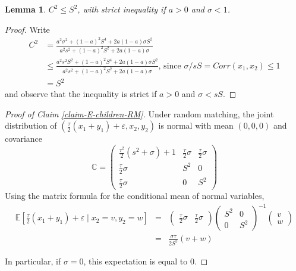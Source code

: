 \documentclass[
]{article}
\newtheorem{lemma}{Lemma}
\theoremstyle{definition}
\theoremstyle{definition}
\theoremstyle{definition}
\theoremstyle{definition}
\theoremstyle{remark}
\begin{document}
\begin{lemma}\label{C2}
 $C^2 \le S^2$, with strict inequality if $a > 0$ and $\sigma < 1$.

\end{lemma}
\begin{proof}
Write
\begin{align*}
C^{2}   &= \frac{
            a^{2}\sigma^{2}+(1-a)^{2}S^{4}+2a(1-a)\sigma S^{2}
         }{
           a^{2}s^{2}+(1-a)^{2}S^{2}+2a(1-a)\sigma
         } \\
    &\le \frac{
        a^{2}s^{2}S^{2}+(1-a)^{2}S^{4}+2a(1-a)\sigma S^{2}
      }{
        a^{2}s^{2}+(1-a)^{2}S^{2}+2a(1-a)\sigma
      }
      \textrm{, since }\sigma/sS = Corr(x_1,x_2) \le 1 \\
    &= S^{2}
\end{align*}
and observe that the inequality is strict if $a > 0$ and $\sigma < sS$.
\end{proof}

\begin{proof}[Proof of Claim \ref{claim-E-children-RM}]

Under random matching, the joint distribution of $\left( \frac{\tau }{2}\left(
x_{1}+y_{1}\right) +\varepsilon ,x_{2},y_{2}\right) $ is normal with mean 
$( 0,0,0)$ and covariance
\[
\mathbb{C}=\left( 
\begin{array}{lcr}
\frac{\tau ^{2}}{2}\left( s^{2}+\sigma \right) +1 & \frac{\tau }{2}\sigma  & 
\frac{\tau }{2}\sigma  \\ 
\frac{\tau }{2}\sigma  & S^{2} & 0 \\ 
\frac{\tau }{2}\sigma  & 0 & S^{2}%
\end{array}%
\right) 
\]%
Using the matrix formula for the conditional mean of normal variables,
\begin{eqnarray*}
\mathbb{E}\left[ \frac{\tau }{2}\left( x_{1}+y_{1}\right) +\varepsilon \mid
x_{2}=v,y_{2}=w\right]  &=&\left( 
\begin{array}{rr}
\frac{\tau }{2}\sigma  & \frac{\tau }{2}\sigma 
\end{array}%
\right) \left( 
\begin{array}{rr}
S^{2} & 0 \\ 
0 & S^{2}%
\end{array}%
\right) ^{-1}\left( 
\begin{array}{r}
v \\ 
w%
\end{array}%
\right)  \\
&=&\frac{\sigma \tau }{2S^{2}}\left( v+w\right) 
\end{eqnarray*}

In particular, if $\sigma =0$, this expectation is equal to 0.
\end{proof}
\end{document}
